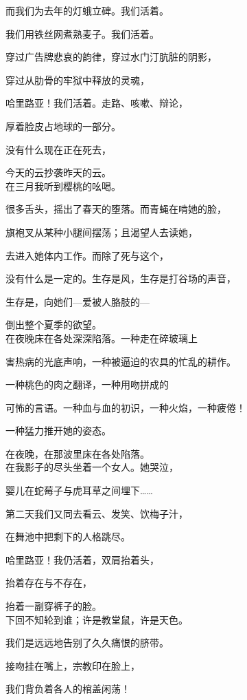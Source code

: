 而我们为去年的灯蛾立碑。我们活着。

我们用铁丝网煮熟麦子。我们活着。

穿过广告牌悲哀的韵律，穿过水门汀肮脏的阴影，

穿过从肋骨的牢狱中释放的灵魂，

哈里路亚！我们活着。走路、咳嗽、辩论，

厚着脸皮占地球的一部分。

没有什么现在正在死去，

今天的云抄袭昨天的云。\\


在三月我听到樱桃的吆喝。

很多舌头，摇出了春天的堕落。而青蝇在啃她的脸，

旗袍叉从某种小腿间摆荡；且渴望人去读她，

去进入她体内工作。而除了死与这个，

没有什么是一定的。生存是风，生存是打谷场的声音，

生存是，向她们---爱被人胳肢的---

倒出整个夏季的欲望。\\


在夜晚床在各处深深陷落。一种走在碎玻璃上

害热病的光底声响，一种被逼迫的农具的忙乱的耕作。

一种桃色的肉之翻译，一种用吻拼成的

可怖的言语。一种血与血的初识，一种火焰，一种疲倦！

一种猛力推开她的姿态。

在夜晚，在那波里床在各处陷落。\\


在我影子的尽头坐着一个女人。她哭泣，

婴儿在蛇莓子与虎耳草之间埋下\dots\dots

第二天我们又同去看云、发笑、饮梅子汁，

在舞池中把剩下的人格跳尽。

哈里路亚！我仍活着，双肩抬着头，

抬着存在与不存在，

抬着一副穿裤子的脸。\\



下回不知轮到谁；许是教堂鼠，许是天色。

我们是远远地告别了久久痛恨的脐带。

接吻挂在嘴上，宗教印在脸上，

我们背负着各人的棺盖闲荡！

